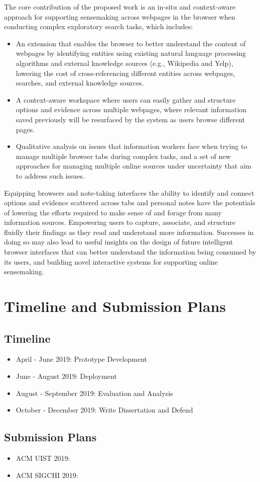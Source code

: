 The core contribution of the proposed work is an in-situ and context-aware approach for supporting sensemaking across webpages in the browser when conducting complex exploratory search tasks, which includes:

\begin{itemize}
\item An extension that enables the browser to better understand the content of webpages by identifying entities using existing natural language processing algorithms and external knowledge sources (e.g., Wikipedia and Yelp), lowering the cost of cross-referencing different entities across webpages, searches, and external knowledge sources. 
\item A context-aware workspace where users can easily gather and structure options and evidence across multiple webpages, where relevant information saved previously will be resurfaced by the system as users browse different pages.
\item Qualitative analysis on issues that information workers face when trying to manage multiple browser tabs during complex tasks, and a set of new approaches for managing multiple online sources under uncertainty that aim to address such issues.
\end{itemize}

Equipping browsers and note-taking interfaces the ability to identify and connect options and evidence scattered across tabs and personal notes have the potentials of lowering the efforts required to make sense of and forage from many information sources. Empowering users to capture, associate, and structure fluidly their findings as they read and understand more information. Successes in doing so may also lead to useful insights on the design of future intelligent browser interfaces that can better understand the information being consumed by its users, and building novel interactive systems for supporting online sensemaking.


\section{Timeline and Submission Plans}

\subsection*{Timeline}

\begin{itemize}
    \item April - June 2019: Prototype Development
    \item June - August 2019: Deployment
    \item August - September 2019: Evaluation and Analysis
    \item October - December 2019: Write Dissertation and Defend 
\end{itemize}

\subsection*{Submission Plans}

\begin{itemize}
    \item ACM UIST 2019: 
    \item ACM SIGCHI 2019: 
\end{itemize}
